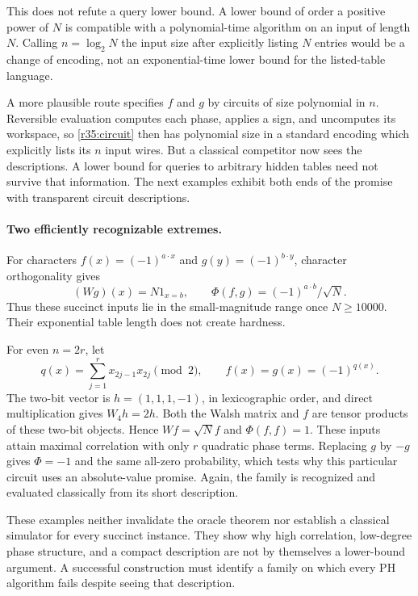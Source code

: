 \documentclass[11pt]{article}
\begin{document}
This does not refute a query lower bound. A lower bound of order a positive
power of $N$ is compatible with a polynomial-time algorithm on an input
of length $N$. Calling $n=\log_2N$ the input size after explicitly listing
$N$ entries would be a change of encoding, not an exponential-time lower
bound for the listed-table language.

A more plausible route specifies $f$ and $g$ by circuits of size polynomial
in $n$. Reversible evaluation computes each phase, applies a sign, and
uncomputes its workspace, so \eqref{r35:circuit} then has polynomial size
in a standard encoding which explicitly lists its $n$ input wires.
But a classical competitor now sees the descriptions. A lower bound for
queries to arbitrary hidden tables need not survive that information.
The next examples exhibit both ends of the promise with transparent
circuit descriptions.

\paragraph{Two efficiently recognizable extremes.}
For characters $f(x)=(-1)^{a\cdot x}$ and $g(y)=(-1)^{b\cdot y}$,
character orthogonality gives
\[
 (Wg)(x)=N1_{x=b},\qquad
              \Phi(f,g)=(-1)^{a\cdot b}/\sqrt N.
\]
Thus these succinct inputs lie in the small-magnitude range once
$N\ge10000$. Their exponential table length does not create hardness.

For even $n=2r$, let
\[
 q(x)=\sum_{j=1}^{r}x_{2j-1}x_{2j}\pmod2,
 \qquad f(x)=g(x)=(-1)^{q(x)}.
\]
The two-bit vector is $h=(1,1,1,-1)$, in lexicographic order, and direct
multiplication gives $W_4h=2h$. Both the Walsh matrix and $f$ are tensor
products of these two-bit objects. Hence $Wf=\sqrt N f$ and
$\Phi(f,f)=1$. These inputs attain maximal correlation with only $r$
quadratic phase terms. Replacing $g$ by $-g$ gives $\Phi=-1$ and the
same all-zero probability, which tests why this particular circuit uses
an absolute-value promise. Again, the family is recognized and evaluated
classically from its short description.

These examples neither invalidate the oracle theorem nor establish a
classical simulator for every succinct instance. They show why high
correlation, low-degree phase structure, and a compact description are
not by themselves a lower-bound argument. A successful construction must
identify a family on which every PH algorithm fails despite seeing that
description.
\end{document}
